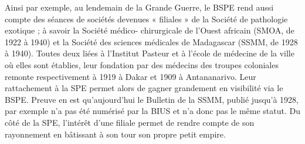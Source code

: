 Ainsi par exemple, au lendemain de la Grande Guerre, le BSPE rend aussi compte des séances de sociétés devenues « filiales » de la Société de pathologie exotique ; à savoir la Société médico- chirurgicale de l'Ouest africain (SMOA, de 1922 à 1940) et la Société des sciences médicales de Madagascar (SSMM, de 1928 à 1940). Toutes deux liées à l’Institut Pasteur et à l’école de médecine de la ville où elles sont établies, leur fondation par des médecins des troupes coloniales remonte respectivement à 1919 à Dakar et 1909 à Antananarivo. Leur rattachement à la SPE permet alors de gagner grandement en visibilité via le BSPE. Preuve en est qu’aujourd’hui le Bulletin de la SSMM, publié jusqu’à 1928, par exemple n’a pas été numérisé par la BIUS et n’a donc pas le même statut. Du côté de la SPE, l’intérêt d’une filiale permet de rendre compte de son rayonnement en bâtissant à son tour son propre petit empire.
